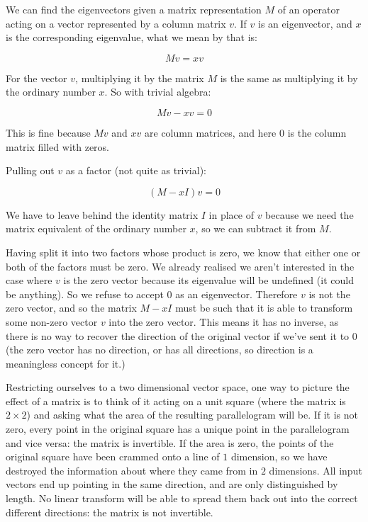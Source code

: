 We can find the eigenvectors given a matrix representation $M$ of an operator acting on a vector represented by a column matrix $v$. If $v$ is an eigenvector, and $x$ is the corresponding eigenvalue, what we mean by that is:

$$Mv = xv$$

For the vector $v$, multiplying it by the matrix $M$ is the same as multiplying it by the ordinary number $x$. So with trivial algebra:

$$Mv - xv = 0$$

This is fine because $Mv$ and $xv$ are column matrices, and here $0$ is the column matrix filled with zeros.

Pulling out $v$ as a factor (not quite as trivial):

$$(M - xI)v = 0$$

We have to leave behind the identity matrix $I$ in place of $v$ because we need the matrix equivalent of the ordinary number $x$, so we can subtract it from $M$.

Having split it into two factors whose product is zero, we know that either one or both of the factors must be zero. We already realised we aren't interested in the case where $v$ is the zero vector because its eigenvalue will be undefined (it could be anything). So we refuse to accept $0$ as an eigenvector. Therefore $v$ is not the zero vector, and so the matrix $M - xI$ must be such that it is able to transform some non-zero vector $v$ into the zero vector. This means it has no inverse, as there is no way to recover the direction of the original vector if we've sent it to $0$ (the zero vector has no direction, or has all directions, so direction is a meaningless concept for it.)

Restricting ourselves to a two dimensional vector space, one way to picture the effect of a matrix is to think of it acting on a unit square (where the matrix is $2 \times 2$) and asking what the area of the resulting parallelogram will be. If it is not zero, every point in the original square has a unique point in the parallelogram and vice versa: the matrix is invertible. If the area is zero, the points of the original square have been crammed onto a line of $1$ dimension, so we have destroyed the information about where they came from in $2$ dimensions. All input vectors end up pointing in the same direction, and are only distinguished by length. No linear transform will be able to spread them back out into the correct different directions: the matrix is not invertible.

